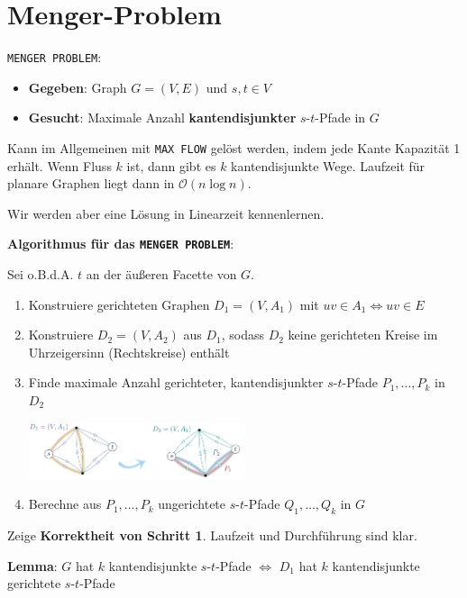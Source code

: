 \section{Menger-Problem}

\texttt{MENGER PROBLEM}:
\begin{itemize}
	\item \textbf{Gegeben}: Graph $G = (V, E)$ und $s, t\in V$
	\item \textbf{Gesucht}: Maximale Anzahl \textbf{kantendisjunkter} $s$-$t$-Pfade in $G$
\end{itemize}

Kann im Allgemeinen mit \texttt{MAX FLOW} gelöst werden, indem jede Kante Kapazität 1 erhält. Wenn Fluss $k$ ist, dann gibt es $k$ kantendisjunkte Wege. Laufzeit für planare Graphen liegt dann in $\mathcal{O}(n\log n)$.

Wir werden aber eine Lösung in Linearzeit kennenlernen.\\
\pagebreak

\textbf{Algorithmus für das \texttt{MENGER PROBLEM}}:

Sei o.B.d.A. $t$ an der äußeren Facette von $G$.
\begin{enumerate}
	\item Konstruiere gerichteten Graphen $D_1=(V,A_1)$ mit $uv\in A_1\iff uv\in E$
	\item Konstruiere $D_2=(V,A_2)$ aus $D_1$, sodass $D_2$ keine gerichteten Kreise im Uhrzeigersinn (Rechtskreise) enthält
	\item Finde maximale Anzahl gerichteter, kantendisjunkter $s$-$t$-Pfade $P_1,\ldots,P_k$ in $D_2$
	\begin{center}
		\includegraphics[width=0.5\textwidth]{images/menger-2.png}
	\end{center}
	\item Berechne aus $P_1,\ldots,P_k$ ungerichtete $s$-$t$-Pfade $Q_1,\ldots,Q_k$ in $G$
\end{enumerate}
\bigskip
Zeige \textbf{Korrektheit von Schritt 1}. Laufzeit und Durchführung sind klar.

\textbf{Lemma}: $G$ hat $k$ kantendisjunkte $s$-$t$-Pfade $\iff$ $D_1$ hat $k$ kantendisjunkte gerichtete $s$-$t$-Pfade

